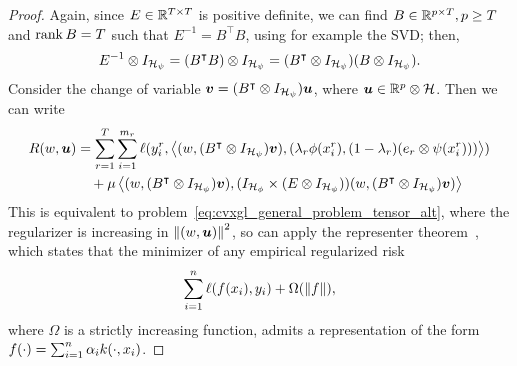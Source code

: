 \begin{proof}
    Again, since ${E} \in \mathbb{R}^{T \times T}$ is positive definite, we can find $B \in \mathbb{R}^{p \times T}, p \geq T$ and $\operatorname{rank}{B} = T$ such that $E^{-1} =
            {B^\intercal} {B}$, using for example the SVD;
    then,
    $$ E^{-1} \otimes I_{\mathcal{H}_\psi} = (B^\intercal B) \otimes I_{\mathcal{H}_\psi} = (B^\intercal \otimes I_{\mathcal{H}_\psi}) (B \otimes I_{\mathcal{H}_\psi}).$$
    Consider the change of variable $\bm{v} = (B^\intercal \otimes I_{\mathcal{H}_\psi}) \bm{u}$, where $\bm{u} \in \mathbb{R}^p \otimes \mathcal{H}$. Then we can write
    \begin{equation}
        \nonumber
        \begin{aligned}
            R(w, \bm{u}) & = \sum_{r=1}^{T} \sum_{i=1}^{m_r} \ell(y_i^r, \bm{\left\langle} (w, (B^\intercal \otimes I_{\mathcal{H}_\psi}) \bm{v}),  (\lambda_r \phi(x_i^r), (1 - \lambda_r) (e_r \otimes \psi(x_i^r))) \bm{\right\rangle}) \\
                         & \quad + \mu \bm{\left\langle} (w, (B^\intercal \otimes I_{\mathcal{H}_\psi})\bm{v}), (I_{\mathcal{H}_\phi} \times (E \otimes I_{\mathcal{H}_\psi})) (w, (B^\intercal \otimes I_{\mathcal{H}_\psi}) \bm{v})  \bm{\right\rangle}                    \\
        \end{aligned}
    \end{equation}
    This is equivalent to problem~\eqref{eq:cvxgl_general_problem_tensor_alt}, where the regularizer is increasing in $\left\lVert(w, \bm{u})\right\rVert^2$, so can apply the representer theorem~\citep{ScholkopfHS01}, which states that the minimizer of any empirical regularized risk
    \begin{equation}
        \nonumber
        \sum_{i=1}^n \ell(f(x_i), y_i) + \Omega(\left\lVert f\right\rVert),
    \end{equation}
    where $\Omega$ is a strictly increasing function,
    admits a representation of the form $f(\cdot) = \sum_{i=1}^n \alpha_i k(\cdot, x_i)$.

\end{proof}
